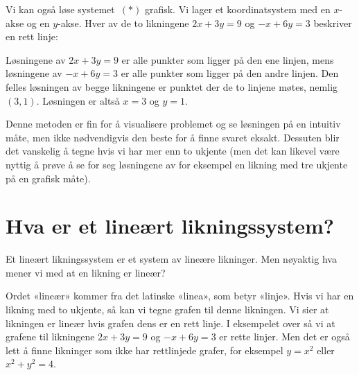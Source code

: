 \begin{ex}
Vi kan også løse systemet~$(\ast)$ grafisk.  Vi lager et
koordinatsystem med en $x$-akse og en $y$-akse.  Hver av de to
likningene $2x+3y=9$ og $-x+6y=3$ beskriver en rett linje:
\begin{center}
\end{center}
Løsningene av $2x + 3y = 9$ er  alle punkter som ligger på den
ene linjen, mens løsningene av $-x + 6y = 3$ er alle punkter som
ligger på den andre linjen.  Den felles løsningen av begge likningene
er punktet der de to linjene møtes, nemlig $(3,1)$.  Løsningen er
altså $x = 3$ og $y = 1$.

Denne metoden er fin for å visualisere problemet og se løsningen på en
intuitiv måte, men ikke nødvendigvis den beste for å finne svaret
eksakt.  Dessuten blir det vanskelig å tegne hvis vi har mer enn to
ukjente (men det kan likevel være nyttig å prøve å se for seg
løsningene av for eksempel en likning med tre ukjente på en grafisk
måte).
\end{ex}


\section*{Hva er et lineært likningssystem?}

Et lineært likningssystem er et system av lineære likninger.  Men
nøyaktig hva mener vi med at en likning er lineær?

Ordet «lineær» kommer fra det latinske «linea», som betyr «linje».
Hvis vi har en likning med to ukjente, så kan vi tegne grafen til
denne likningen.  Vi sier at likningen er lineær hvis grafen dens er
en rett linje.  I eksempelet over så vi at grafene til likningene
$2x + 3y = 9$ og $-x + 6y = 3$ er rette linjer.  Men det er også lett
å finne likninger som ikke har rettlinjede grafer, for eksempel
$y = x^2$ eller $x^2 + y^2 = 4$.

